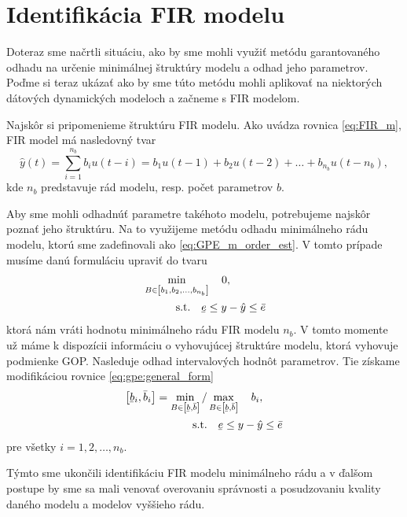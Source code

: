 \section{Identifikácia FIR modelu}
Doteraz sme načrtli situáciu, ako by sme mohli využiť metódu garantovaného odhadu na určenie minimálnej štruktúry modelu a odhad jeho parametrov. Poďme si teraz ukázať ako by sme túto metódu mohli aplikovať na niektorých dátových dynamických modeloch a začneme s FIR modelom.

Najskôr si pripomenieme štruktúru FIR modelu. Ako uvádza rovnica \ref{eq:FIR_m}, FIR model má nasledovný tvar
\begin{equation*}
	\hat{y}(t) = \sum_{i=1}^{n_b} b_{i}u(t-i) = b_{1}u(t-1) + b_{2}u(t-2) + \dots + b_{n_b}u(t-n_b),
\end{equation*}
kde $ n_b $ predstavuje rád modelu, resp. počet parametrov $ b $. 

Aby sme mohli odhadnúť parametre takéhoto modelu, potrebujeme najskôr poznať jeho štruktúru. Na to využijeme metódu odhadu minimálneho rádu modelu, ktorú sme zadefinovali ako \ref{eq:GPE_m_order_est}. V tomto prípade musíme danú formuláciu upraviť do tvaru
\begin{equation}
	\begin{split}
		& \min_{B \in \left[ b_{1}, b_{2}, \dots, b_{n_b} \right]} \quad 0, \\
		& \qquad \quad \text{s.t.} \quad \ubar{e} \leq y - \hat{y} \leq \bar{e}
	\end{split}
	\label{eq:gpe_fir_min_rad}
\end{equation} 
ktorá nám vráti hodnotu minimálneho rádu FIR modelu $ n_b $. V tomto momente už máme k dispozícii informáciu o vyhovujúcej štruktúre modelu, ktorá vyhovuje podmienke GOP. Nasleduje odhad intervalových hodnôt parametrov. Tie získame modifikáciou rovnice \ref{eq:gpe:general_form}
\begin{equation}
	\begin{split}
		\left[ \ubar{b}_i, \bar{b}_i \right] = \min_{B \in \left[ \ubar{b}, \bar{b} \right]} / &\max_{B \in \left[ \ubar{b}, \bar{b} \right]} \quad b_i,\\
		\text{s.t.}& \quad \ubar{e} \leq y - \hat{y} \leq \bar{e}	
	\end{split}
	\label{eq:gpe_fir_param_est}
\end{equation}
pre všetky $ i = 1, 2, \dots, n_b $.  

Týmto sme ukončili identifikáciu FIR modelu minimálneho rádu a v ďalšom postupe by sme sa mali venovať overovaniu správnosti a posudzovaniu kvality daného modelu a modelov vyššieho rádu.

